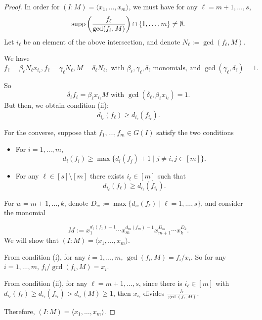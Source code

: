 \documentclass[11pt]{amsart}   %
\begin{document}
\begin{proof}

In order for $(I:M)=\langle x_1,\ldots,x_m\rangle$, we must have  for any $\ell=m+1,\ldots,s$, $${\rm supp}\left(\frac{f_{\ell}}{\gcd(f_{\ell},M)}\right)\cap\{1,\ldots,m\}\neq\emptyset.$$ Let $i_{\ell}$ be an element of the above intersection, and denote $N_{\ell}:=\gcd(f_{\ell},M)$.

We have $$f_{\ell}=\beta_{\ell}N_{\ell}x_{i_{\ell}}, f_{\ell}=\gamma_{\ell}N_{\ell}, M=\delta_{\ell}N_{\ell}, \mbox{ with } \beta_{\ell}, \gamma_{\ell}, \delta_{\ell} \mbox{ monomials, and } \gcd(\gamma_{\ell},\delta_{\ell})=1.$$

So $$\delta_{\ell}f_{\ell}=\beta_{\ell}x_{i_{\ell}}M \mbox{ with } \gcd(\delta_{\ell},\beta_{\ell}x_{i_{\ell}})=1.$$ But then, we obtain condition (ii): $$d_{i_{\ell}}(f_{\ell})\geq d_{i_{\ell}}(f_{i_{\ell}}).$$

\medskip

For the converse, suppose that $f_1,\ldots,f_m\in G(I)$ satisfy the two conditions
\begin{itemize}
    \item[(i)] For $i=1,\ldots,m$, $$d_{i}(f_{i})\geq \max\{d_{i}(f_{j})+1\mid j\neq i, j\in[m]\}.$$
    \item[(ii)] For any $\ell\in[s]\setminus[m]$ there exists $i_{\ell}\in[m]$ such that $$d_{i_{\ell}}(f_{\ell})\geq d_{i_{\ell}}(f_{i_{\ell}}).$$   
\end{itemize}

For $w=m+1,\ldots,k$, denote $D_w:=\max\{d_w(f_{\ell})\mid \ell=1,\ldots,s\}$, and consider the monomial

$$M:=x_1^{d_1(f_1)-1}\cdots x_m^{d_m(f_m)-1}x_{m+1}^{D_m}\cdots x_k^{D_k}.$$ We will show that $(I:M)=\langle x_1,\ldots,x_m\rangle$.

From condition (i), for any $i=1,\ldots,m$, $\displaystyle \gcd(f_i,M)={f_i}/{x_i}$. So for any $i=1,\ldots,m$, $f_i/\gcd(f_i,M)=x_i$.

From condition (ii), for any $\ell=m+1,\ldots,s$, since there is $i_{\ell}\in[m]$ with $d_{i_{\ell}}(f_{\ell})\geq d_{i_{\ell}}(f_{i_{\ell}})>d_{i_{\ell}}(M)\geq 1$, then $ x_{i_{\ell}}$ divides $\displaystyle\frac{f_{\ell}}{\gcd(f_{\ell},M)}$.

Therefore, $(I:M)=\langle x_1,\ldots,x_m\rangle$.
\end{proof}
\end{document}
